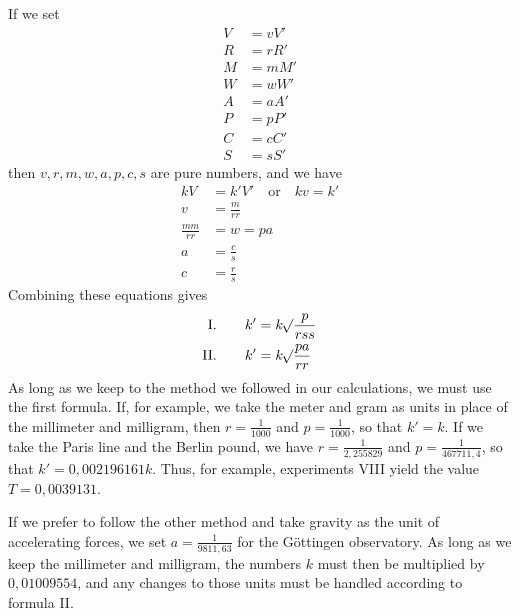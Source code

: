 If we set
\[
\begin{aligned}
V&=vV'\\
R&=rR'\\
M&=mM'\\
W&=wW'\\
A&=aA'\\
P&=pP'\\
C&=cC'\\
S&=sS'
\end{aligned}
\]
then $v,r,m,w,a,p,c,s$ are pure numbers, and we have
\[
\begin{aligned}
kV&=k'V'\quad\text{or}\quad kv=k'\\
v&=\frac m{rr}\\
\frac{mm}{rr}&=w=pa\\
a&=\frac cs\\
c&=\frac rs
\end{aligned}
\]
Combining these equations gives
\[
\begin{aligned}
\text{I.}\qquad k'&=k\mathord{{}^{}\!\surd}\frac p{rss}\\
\text{II.}\qquad k'&=k\mathord{{}^{}\!\surd}\frac{pa}{rr}
\end{aligned}
\]
As long as we keep to the method we followed in our calculations, we must use the first formula. If, for example, we take the meter and gram as units in place of the millimeter and milligram, then $r=\frac1{1000}$ and $p=\frac1{1000}$, so that $k'=k$. If we take the Paris line and the Berlin pound, we have $r=\frac1{2{,}255829}$ and $p=\frac1{467711{,}4}$, so that $k'=0{,}002196161k$. Thus, for example, experiments VIII yield the value $T=0{,}0039131$.

If we prefer to follow the other method and take gravity as the unit of accelerating forces, we set $a=\frac1{9811{,}63}$ for the Göttingen observatory. As long as we keep the millimeter and milligram, the numbers $k$ must then be multiplied by $0{,}01009554$, and any changes to those units must be handled according to formula II.

